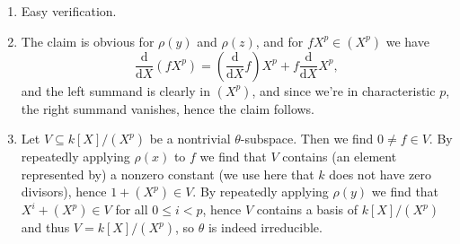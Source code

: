 \begin{enumerate}[label=(\alph*)]
	\item Easy verification.
	\item The claim is obvious for $\rho(y)$ and $\rho(z)$, and for
		$fX^p \in (X^p)$ we have
		\[ \frac{\mathrm{d}}{\mathrm{d}X}(fX^p) =
		\left(\frac{\mathrm{d}}{\mathrm{d}X}f\right)X^p +
		f\frac{\mathrm{d}}{\mathrm{d}X}X^p, \]
		and the left summand is clearly in $(X^p)$, and since we're in
		characteristic $p$, the right summand vanishes, hence the claim follows.
	\item Let $V \subseteq k[X]/(X^p)$ be a nontrivial $\theta$-subspace.
		Then we find $0\neq f \in V$. By repeatedly applying $\rho(x)$ to $f$ we
		find that $V$ contains (an element represented by) a nonzero constant
		(we use here that $k$ does not have zero divisors),
		hence $1 + (X^p) \in V$. By repeatedly applying $\rho(y)$ we find that
		$X^i + (X^p) \in V$ for all $0 \leq i < p$, hence $V$ contains a
		basis of $k[X]/(X^p)$ and thus $V = k[X]/(X^p)$, so $\theta$ is
		indeed irreducible.\qedhere
\end{enumerate}
